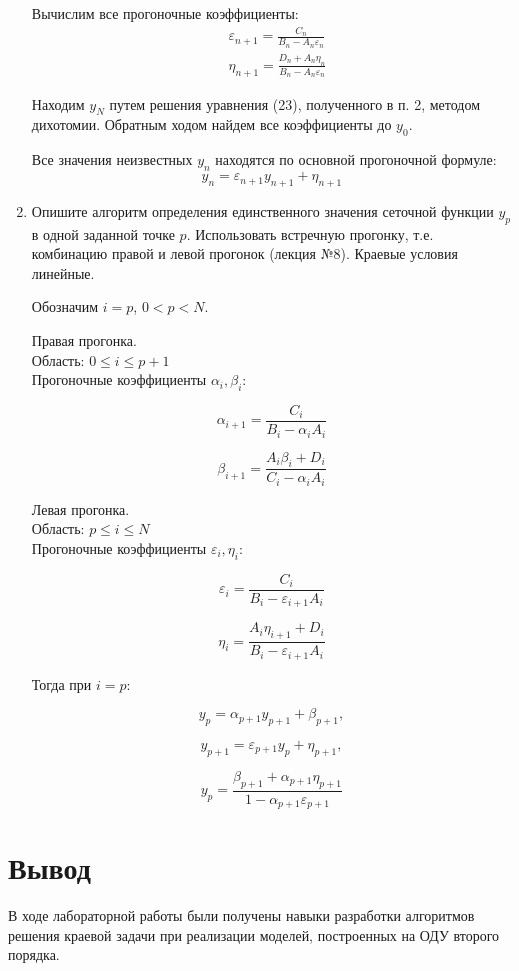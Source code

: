 \documentclass[a4paper, 14pt]{article}
\begin{document}
\begin{enumerate}
Вычислим все прогоночные коэффициенты:
$$
\begin{aligned}
&\varepsilon_{n+1} = \frac{C_n}{B_n-A_n\varepsilon_n}\\
&\eta_{n+1} = \frac{D_n+A_n\eta_n}{B_n-A_n\varepsilon_n}
\end{aligned}
$$

Находим $y_N$ путем решения уравнения (23), полученного в п. 2, методом дихотомии. Обратным ходом найдем все коэффициенты до $y_0$.

Все значения неизвестных $y_n$ находятся по основной прогоночной формуле: 
$$ y_n=\varepsilon_{n+1}y_{n+1}+\eta_{n+1} $$

	\item Опишите алгоритм определения единственного значения сеточной функции $y_p$ в одной заданной точке $p$. Использовать встречную прогонку, т.е. комбинацию правой и левой прогонок (лекция №8). Краевые условия линейные.
	
Обозначим $i=p$, $0<p<N$. 

Правая прогонка.\\
Область: $0\le i \le p+1$\\
Прогоночные коэффициенты $\alpha_i, \beta_i$:

$$\alpha_{i+1}=\frac{C_i}{B_i-\alpha_iA_i}$$

$$\beta_{i+1}=\frac{A_i\beta_i+D_i}{C_i-\alpha_iA_i}$$

Левая прогонка.\\
Область: $p\le i \le N$ \\
Прогоночные коэффициенты $\varepsilon_i, \eta_i$:

$$\varepsilon_{i}=\frac{C_i}{B_i-\varepsilon_{i+1}A_i}$$

$$\eta_{i}=\frac{A_i\eta_{i+1}+D_i}{B_i-\varepsilon_{i+1}A_i}$$

Тогда при $i=p$:

$$y_p=\alpha_{p+1}y_{p+1}+\beta_{p+1},$$

$$y_{p+1}=\varepsilon_{p+1}y_{p}+\eta_{p+1},$$

$$y_{p}=\frac{\beta_{p+1}+\alpha_{p+1}\eta_{p+1}}{1-\alpha_{p+1}\varepsilon_{p+1}}$$

\end{enumerate}

\section*{Вывод}

В ходе лабораторной работы были получены навыки разработки  алгоритмов решения краевой задачи при реализации моделей, построенных на  ОДУ второго порядка.
\end{document}
